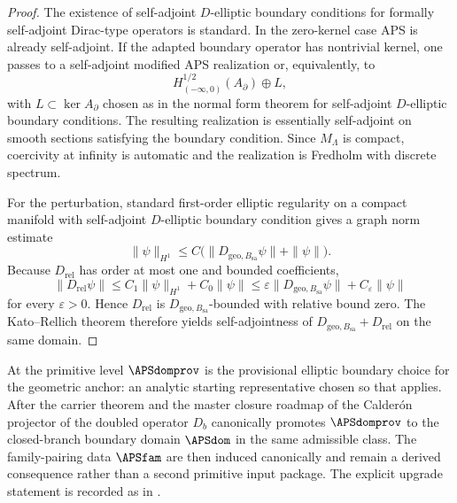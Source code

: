 
\begin{proof}
The existence of self-adjoint $D$-elliptic boundary conditions for formally self-adjoint Dirac-type
operators is standard. In the zero-kernel case APS is already self-adjoint. If the adapted
boundary operator has nontrivial kernel, one passes to a self-adjoint modified APS realization or,
equivalently, to
\[
H^{1/2}_{(-\infty,0)}(A_\partial)\oplus L,
\]
with $L\subset\ker A_\partial$ chosen as in the normal form theorem for self-adjoint $D$-elliptic
boundary conditions. The resulting realization is essentially self-adjoint on smooth sections
satisfying the boundary condition. Since $M_\Lambda$ is compact, coercivity at infinity is
automatic and the realization is Fredholm with discrete spectrum.

For the perturbation, standard first-order elliptic regularity on a compact manifold with
self-adjoint $D$-elliptic boundary condition gives a graph norm estimate
\[
\|\psi\|_{H^1}\le C\bigl(\|D_{\mathrm{geo},B_{\mathrm{sa}}}\psi\|+\|\psi\|\bigr).
\]
Because $D_{\mathrm{rel}}$ has order at most one and bounded coefficients,
\[
\|D_{\mathrm{rel}}\psi\|
\le
C_1\|\psi\|_{H^1}+C_0\|\psi\|
\le
\varepsilon\|D_{\mathrm{geo},B_{\mathrm{sa}}}\psi\|+C_\varepsilon\|\psi\|
\]
for every $\varepsilon>0$. Hence $D_{\mathrm{rel}}$ is $D_{\mathrm{geo},B_{\mathrm{sa}}}$-bounded
with relative bound zero. The Kato--Rellich theorem therefore yields self-adjointness of
$D_{\mathrm{geo},B_{\mathrm{sa}}}+D_{\mathrm{rel}}$ on the same domain.
\end{proof}

\begin{remark}
\label{rem:aps-roles}
At the primitive level $\APSdomprov$ is the provisional elliptic boundary choice for the
geometric anchor: an analytic starting representative chosen so that
 applies. After the carrier theorem and the master
closure roadmap of  the Calder\'on projector of the doubled operator
$D_b$ canonically promotes $\APSdomprov$ to the closed-branch boundary domain $\APSdom$ in the
same admissible class. The family-pairing data $\APSfam$ are then induced canonically and remain
a derived consequence rather than a second primitive input package. The explicit upgrade
statement is recorded as  in .
\end{remark}

